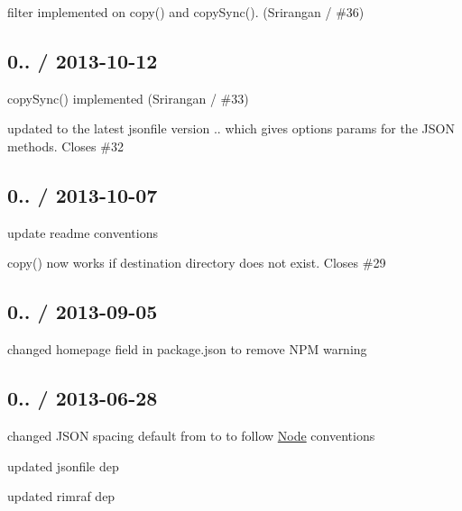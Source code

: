\begin{DoxyItemize}
\item {\ttfamily filter} implemented on {\ttfamily copy()} and {\ttfamily copy\+Sync()}. (Srirangan / \#36)
\end{DoxyItemize}

\subsection*{0.. / 2013-\/10-\/12 }


\begin{DoxyItemize}
\item {\ttfamily copy\+Sync()} implemented (Srirangan / \#33)
\item updated to the latest {\ttfamily jsonfile} version {..} which gives {\ttfamily options} params for the J\+S\+ON methods. Closes \#32
\end{DoxyItemize}

\subsection*{0.. / 2013-\/10-\/07 }


\begin{DoxyItemize}
\item update readme conventions
\item {\ttfamily copy()} now works if destination directory does not exist. Closes \#29
\end{DoxyItemize}

\subsection*{0.. / 2013-\/09-\/05 }


\begin{DoxyItemize}
\item changed {\ttfamily homepage} field in package.\+json to remove N\+PM warning
\end{DoxyItemize}

\subsection*{0.. / 2013-\/06-\/28 }


\begin{DoxyItemize}
\item changed J\+S\+ON spacing default from {} to {} to follow \mbox{\hyperlink{classNode}{Node}} conventions
\item updated {\ttfamily jsonfile} dep
\item updated {\ttfamily rimraf} dep
\end{DoxyItemize}

